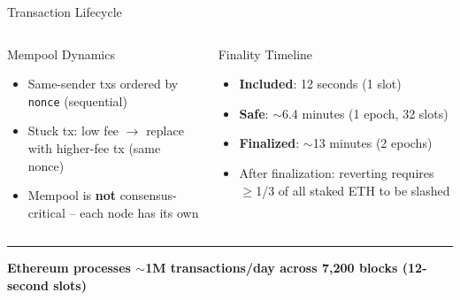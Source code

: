 \documentclass[8pt,aspectratio=169]{beamer}
\newcommand{\bottomnote}[1]{\vfill\vspace{-2mm}\textcolor{mllavender2}{\rule{\textwidth}{0.4pt}}\vspace{1mm}\footnotesize\textbf{#1}}
\begin{document}
\begin{frame}{Transaction Lifecycle}
\begin{columns}
\begin{block}{Mempool Dynamics}
\begin{itemize}
  \item Same-sender txs ordered by \texttt{nonce} (sequential)
  \item Stuck tx: low fee $\to$ replace with higher-fee tx (same nonce)
  \item Mempool is \textbf{not} consensus-critical -- each node has its own
\end{itemize}
\end{block}
\begin{block}{Finality Timeline}
\begin{itemize}\small
  \item \textbf{Included}: 12 seconds (1 slot)
  \item \textbf{Safe}: $\sim$6.4 minutes (1 epoch, 32 slots)
  \item \textbf{Finalized}: $\sim$13 minutes (2 epochs)
  \item After finalization: reverting requires $\geq$1/3 of all staked ETH to be slashed
\end{itemize}
\end{block}
\end{columns}
\bottomnote{Ethereum processes $\sim$1M transactions/day across 7,200 blocks (12-second slots)}
\end{frame}
\end{document}

